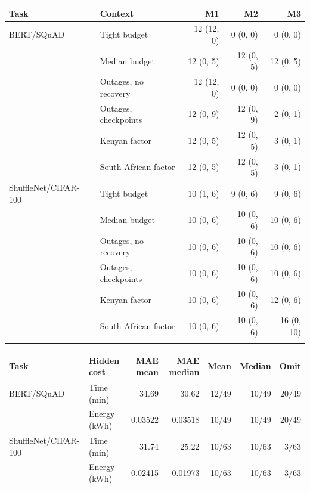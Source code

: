 \begin{tabular}{@{}llrrr@{}}
\toprule
Task & Context & M1 & M2 & M3 \\
\midrule
BERT/SQuAD & Tight budget & 12 (12, 0) & 0 (0, 0) & 0 (0, 0) \\
 & Median budget & 12 (0, 5) & 12 (0, 5) & 12 (0, 5) \\
 & Outages, no recovery & 12 (12, 0) & 0 (0, 0) & 0 (0, 0) \\
 & Outages, checkpoints & 12 (0, 9) & 12 (0, 9) & 2 (0, 1) \\
 & Kenyan factor & 12 (0, 5) & 12 (0, 5) & 3 (0, 1) \\
 & South African factor & 12 (0, 5) & 12 (0, 5) & 3 (0, 1) \\
\addlinespace
ShuffleNet/CIFAR-100 & Tight budget & 10 (1, 6) & 9 (0, 6) & 9 (0, 6) \\
 & Median budget & 10 (0, 6) & 10 (0, 6) & 10 (0, 6) \\
 & Outages, no recovery & 10 (0, 6) & 10 (0, 6) & 10 (0, 6) \\
 & Outages, checkpoints & 10 (0, 6) & 10 (0, 6) & 10 (0, 6) \\
 & Kenyan factor & 10 (0, 6) & 10 (0, 6) & 12 (0, 6) \\
 & South African factor & 10 (0, 6) & 10 (0, 6) & 16 (0, 10) \\
\addlinespace
\bottomrule
\end{tabular}

\begin{tabular}{@{}llrrrrr@{}}
\toprule
Task & Hidden cost & MAE mean & MAE median & Mean & Median & Omit \\
\midrule
BERT/SQuAD & Time (min) & 34.69 & 30.62 & 12/49 & 10/49 & 20/49 \\
 & Energy (kWh) & 0.03522 & 0.03518 & 10/49 & 10/49 & 20/49 \\
ShuffleNet/CIFAR-100 & Time (min) & 31.74 & 25.22 & 10/63 & 10/63 & 3/63 \\
 & Energy (kWh) & 0.02415 & 0.01973 & 10/63 & 10/63 & 3/63 \\
\bottomrule
\end{tabular}
